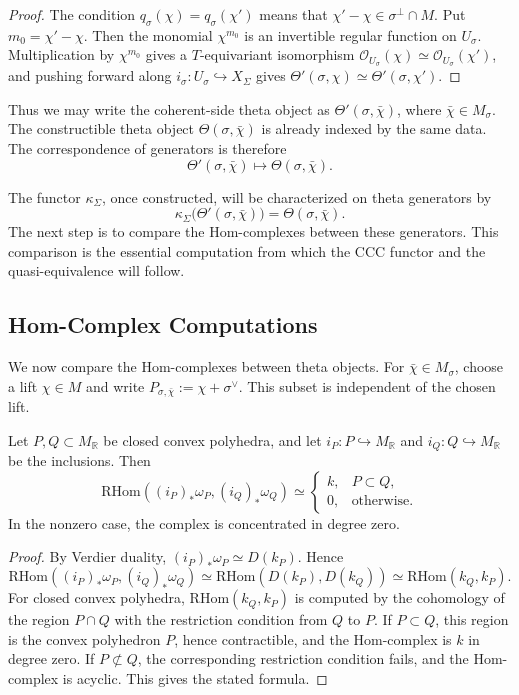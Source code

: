 \begin{proof}
The condition \(q_\sigma(\chi)=q_\sigma(\chi')\) means that
\(\chi'-\chi\in\sigma^\perp\cap M\). Put \(m_0=\chi'-\chi\). Then the
monomial \(\chi^{m_0}\) is an invertible regular function on \(U_\sigma\).
Multiplication by \(\chi^{m_0}\) gives a \(T\)-equivariant isomorphism
\(\mathcal O_{U_\sigma}(\chi)\simeq\mathcal O_{U_\sigma}(\chi')\), and
pushing forward along \(i_\sigma:U_\sigma\hookrightarrow X_\Sigma\) gives
\(\Theta'(\sigma,\chi)\simeq\Theta'(\sigma,\chi')\).
\end{proof}

Thus we may write the coherent-side theta object as
\(\Theta'(\sigma,\bar\chi)\), where \(\bar\chi\in M_\sigma\). The
constructible theta object \(\Theta(\sigma,\bar\chi)\) is already indexed by
the same data. The correspondence of generators is therefore
\[
\Theta'(\sigma,\bar\chi)\longmapsto \Theta(\sigma,\bar\chi).
\]

The functor \(\kappa_\Sigma\), once constructed, will be characterized on
theta generators by
\[
\kappa_\Sigma\bigl(\Theta'(\sigma,\bar\chi)\bigr)
=
\Theta(\sigma,\bar\chi).
\]
The next step is to compare the Hom-complexes between these generators. This
comparison is the essential computation from which the CCC functor and the
quasi-equivalence will follow.
\subsection{Hom-Complex Computations}
We now compare the Hom-complexes between theta objects. For
\(\bar\chi\in M_\sigma\), choose a lift \(\chi\in M\) and write
\(P_{\sigma,\bar\chi}:=\chi+\sigma^\vee\). This subset is independent of the
chosen lift.


\begin{lemma}
\label{lem:hom-polyhedral-costandard-sheaves}
Let \(P,Q\subset M_{\mathbb R}\) be closed convex polyhedra, and let
\(i_P:P\hookrightarrow M_{\mathbb R}\) and
\(i_Q:Q\hookrightarrow M_{\mathbb R}\) be the inclusions. Then
\[
\mathrm{RHom}((i_P)_*\omega_P,(i_Q)_*\omega_Q)
\simeq
\begin{cases}
k, & P\subset Q,\\
0, & \text{otherwise}.
\end{cases}
\]
In the nonzero case, the complex is concentrated in degree zero.
\end{lemma}

\begin{proof}
By Verdier duality, \((i_P)_*\omega_P\simeq D(k_P)\). Hence
\[
\mathrm{RHom}((i_P)_*\omega_P,(i_Q)_*\omega_Q)
\simeq
\mathrm{RHom}(D(k_P),D(k_Q))
\simeq
\mathrm{RHom}(k_Q,k_P).
\]
For closed convex polyhedra, \(\mathrm{RHom}(k_Q,k_P)\) is computed by the
cohomology of the region \(P\cap Q\) with the restriction condition from \(Q\)
to \(P\). If \(P\subset Q\), this region is the convex polyhedron \(P\), hence
contractible, and the Hom-complex is \(k\) in degree zero. If
\(P\not\subset Q\), the corresponding restriction condition fails, and the
Hom-complex is acyclic. This gives the stated formula.
\end{proof}


